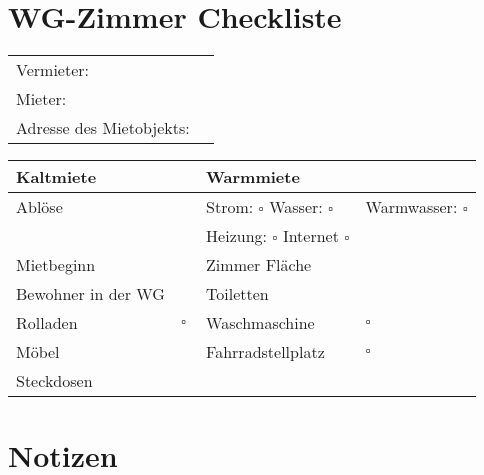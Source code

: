 \documentclass[a4paper]{scrartcl}
\begin{document}
\section*{WG-Zimmer Checkliste}


\begin{tabular*}{\textwidth}{ll@{}}
Vermieter:               &  \\ %
Mieter:                  &  \\ %
Adresse des Mietobjekts: &  \\ %
\end{tabular*}

\begin{tabular*}{\textwidth}{|l|p{4cm}|l|p{4.2cm}|}
\hline
Kaltmiete          & ~ & Warmmiete                                    & ~ \\\hline
Ablöse             & ~ & Strom: $\square$ Wasser: $\square$   & Warmwasser: $\square$ \\\hline
                   & ~ & Heizung: $\square$ Internet $\square$ & ~ \\\hline
Mietbeginn         & ~ & Zimmer Fläche                                & ~ \\\hline
Bewohner in der WG & ~ & Toiletten                                    & ~ \\\hline
Rolladen           & $\square$ & Waschmaschine                                & $\square$ \\\hline
Möbel              & ~ & Fahrradstellplatz                            & $\square$ \\\hline
Steckdosen         & ~ & ~                                            & ~ \\\hline
\end{tabular*}


\section*{Notizen}
\end{document}
